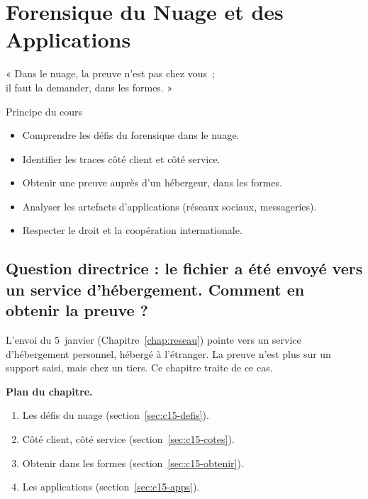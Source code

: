 
\chapter{Forensique du Nuage et des Applications}
\label{chap:nuage}

\epigraph{%
    « Dans le nuage, la preuve n'est pas chez vous~;\\
    il faut la demander, dans les formes. »%
}{Principe du cours}


\begin{boxobjectifs}
\begin{itemize}
    \item Comprendre les défis du forensique dans le nuage.
    \item Identifier les traces côté client et côté service.
    \item Obtenir une preuve auprès d'un hébergeur, dans les formes.
    \item Analyser les artefacts d'applications (réseaux sociaux, messageries).
    \item Respecter le droit et la coopération internationale.
\end{itemize}
\end{boxobjectifs}

\bigskip

\section*{Question directrice : le fichier a été envoyé vers un service d'hébergement. Comment en obtenir la preuve ?}

L'envoi du 5~janvier (Chapitre~\ref{chap:reseau}) pointe vers un service
d'hébergement personnel, hébergé à l'étranger. La preuve n'est plus sur un
support saisi, mais chez un tiers. Ce chapitre traite de ce cas.

\medskip
\textbf{Plan du chapitre.}
\begin{enumerate}
    \item Les défis du nuage (section~\ref{sec:c15-defis}).
    \item Côté client, côté service (section~\ref{sec:c15-cotes}).
    \item Obtenir dans les formes (section~\ref{sec:c15-obtenir}).
    \item Les applications (section~\ref{sec:c15-apps}).
\end{enumerate}

